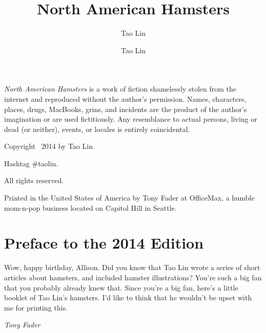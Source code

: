 \documentclass[10pt,twoside,openright]{memoir}
\author{Tao Lin}
\author{Tao Lin}
\title{North American Hamsters}
\date{}
\makeatletter
\def\maketitle{%
  \null
  \thispagestyle{empty}%
  \vfill
  \begin{center}\leavevmode
    \normalfont
    {\LARGE\raggedleft \@author\par}%
    \hrulefill\par
    {\huge\raggedright \@title\par}%
    \vskip 1cm
  \end{center}%
  \vfill
  \null
  \cleardoublepage
  }
\makeatother
\begin{document}
\OnehalfSpacing


\let\cleardoublepage\clearpage


\maketitle






\frontmatter


\null\vfill

\begin{flushleft}
\scriptsize
{\em North American Hamsters} is a work of fiction shamelessly stolen from the
internet and reproduced without the author's permission. Names, characters,
places, drugs, MacBooks, grins, and incidents are the product of the author's
imagination or are used fictitiously. Any resemblance to actual persons, 
living or dead (or neither), events, or locales is entirely coincidental. 

\bigskip

Copyright \textcopyright\ 2014 by Tao Lin
\bigskip

Hashtag \#taolin.
\bigskip

All rights reserved. 
\bigskip

Printed in the United States of America by Tony Fader at OfficeMax, a humble
mom-n-pop business located on Capitol Hill in Seattle. 


\end{flushleft}
\let\cleardoublepage\clearpage

\mainmatter
\sloppy

\renewcommand\cftchapteraftersnumb{\normalfont\tiny}
\tableofcontents*




\chapter*{Preface to the 2014 Edition}
Wow, happy birthday, Allison. Did you know that Tao Lin wrote a series of 
short articles about hamsters, and included hamster illustrations? You're such a
big fan that you probably already knew that. Since you're a big fan, here's a
little booklet of Tao Lin's hamsters. I'd like to think that he wouldn't be 
upset with me for printing this.

\vspace{.5em}
\hspace{7em} {\em Tony Fader} 
\end{document}
